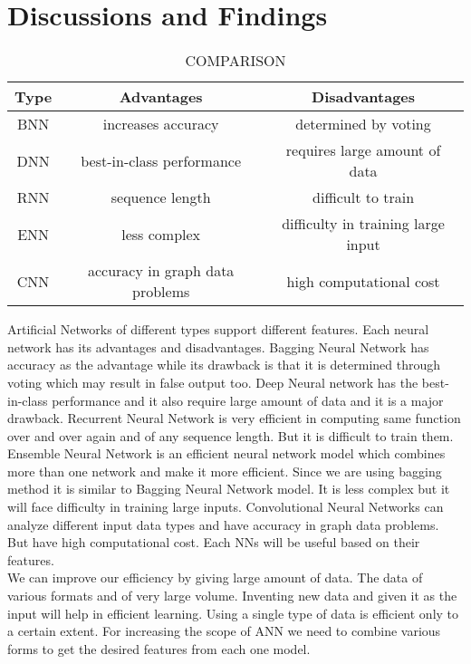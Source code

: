 \documentclass[10pt,a4paper,journal]{IEEEtran}
\begin{document}
\section{Discussions and Findings}
\begin{table}[ht]
\caption{COMPARISON}
\centering 
\begin{tabular}{ccc}
\hline\hline
{Type} & {Advantages} & {Disadvantages}\\[0.01ex]
\hline
BNN & increases accuracy& determined by voting\\
DNN & best-in-class performance  & requires large amount of data\\
RNN & sequence length & difficult to train\\
ENN & less complex & difficulty in training large input \\
CNN & accuracy in graph data problems & high computational cost\\[0.1ex]
\hline
\end{tabular}
\end{table}
\hspace{2em}Artificial Networks of different types support different features. Each neural network has its advantages and disadvantages. 
Bagging Neural Network\cite{1} has accuracy as the advantage while its drawback is that it is determined through voting which may result in false output too. Deep Neural network\cite{2} has the best-in-class performance and it also require large amount of data and it is a major drawback.  Recurrent Neural Network\cite{3} is very efficient in computing same function over and over again and of any sequence length. But it is difficult to train them. Ensemble Neural Network\cite{4} is an efficient neural network model which combines more than one network and make it more efficient. Since we are using bagging method it is similar to Bagging Neural Network model. It is less complex but it will face difficulty in training large inputs. Convolutional Neural Networks\cite{5} can analyze different input data types and have accuracy in graph data problems. But have high computational cost. Each NNs will be useful based on their features.\\ 

\hspace{2em}We can improve our efficiency by giving large amount of data. The data of various formats and of very large volume. Inventing new data and given it as the input will help in efficient learning. Using a single type of data is efficient only to a certain extent. For increasing the scope of ANN we need to combine various forms to get the desired features from each one model.\\
\end{document}
